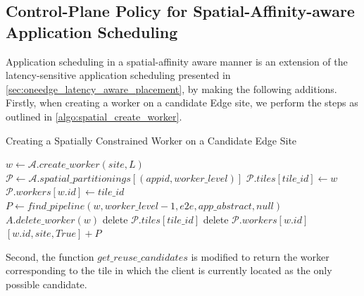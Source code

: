 \subsection{Control-Plane Policy for Spatial-Affinity-aware Application Scheduling}
Application scheduling in a spatial-affinity aware manner is an extension of the latency-sensitive application scheduling presented in \cref{sec:oneedge_latency_aware_placement}, by making the following additions. Firstly, when creating a worker on a candidate Edge site, we perform the steps as outlined in \cref{algo:spatial_create_worker}.

\begin{algorithm}
\caption{Creating a Spatially Constrained Worker on a Candidate Edge Site}
\label{algo:spatial_create_worker}
\begin{algorithmic}[1]
\State $w \gets \mathcal{A}.create\_worker \left( site, L\right)$
    \State $\mathcal{P} \gets \mathcal{A}.spatial\_partitionings [\left( appid, worker\_level\right) ]$
    \State $\mathcal{P}.tiles[tile\_id] \gets w$
    \State $\mathcal{P}.workers[w.id] \gets tile\_id$
\EndIf
\State $P \gets find\_pipeline \left( w, worker\_level - 1, e2e, app\_abstract, null\right)$
    \State $A.delete\_worker \left( w \right)$
    \State delete $\mathcal{P}.tiles[tile\_id]$
    \State delete $\mathcal{P}.workers[w.id]$
\Else
    \State \Return $[w.id, site, True] + P$
\EndIf
\end{algorithmic}
\end{algorithm}

Second, the function $get\_reuse\_candidates$ is modified to return the worker corresponding to the tile in which the client is currently located as the only possible candidate.

